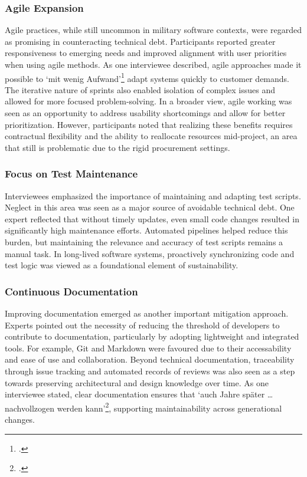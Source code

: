 \subsubsection{Agile Expansion}
Agile practices, while still uncommon in military software contexts, were regarded as promising in counteracting technical debt. Participants reported greater responsiveness to emerging needs and improved alignment with user priorities when using agile methods.
As one interviewee described, agile approaches made it possible to `mit wenig Aufwand'\footcite{Interview32025} adapt systems quickly to customer demands. The iterative nature of sprints also enabled isolation of complex issues and allowed for more focused problem-solving.
In a broader view, agile working was seen as an opportunity to address usability shortcomings and allow for better prioritization. However, participants noted that realizing these benefits requires contractual flexibility and the ability to reallocate resources mid-project, an area that still is problematic due to the rigid procurement settings.

\subsubsection{Focus on Test Maintenance}
Interviewees emphasized the importance of maintaining and adapting test scripts. Neglect in this area was seen as a major source of avoidable technical debt. One expert reflected that without timely updates, even small code changes resulted in significantly high maintenance efforts.
Automated pipelines helped reduce this burden, but maintaining the relevance and accuracy of test scripts remains a manual task. In long-lived software systems, proactively synchronizing code and test logic was viewed as a foundational element of sustainability.

\subsubsection{Continuous Documentation}
Improving documentation emerged as another important mitigation approach. Experts pointed out the necessity of reducing the threshold of developers to contribute to documentation, particularly by adopting lightweight and integrated tools. For example, Git and Markdown were favoured due to their accessability and ease of use and collaboration.
Beyond technical documentation, traceability through issue tracking and automated records of reviews was also seen as a step towards preserving architectural and design knowledge over time. As one interviewee stated, clear documentation ensures that `auch Jahre später \ldots nachvollzogen werden kann'\footcite{Interview22025}, supporting maintainability across generational changes.

